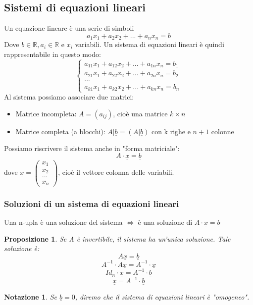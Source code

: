 \documentclass[12pt]{article}
\newenvironment{para}{\begin{adjustwidth}{13mm}{}}{\end{adjustwidth}}
\newtheorem{Proposizione}{Proposizione}[subsection]
\newtheorem{Notazione}{Notazione}[subsection]
\begin{document}
\begin{para}
\subsection{Sistemi di equazioni lineari}
Un equazione lineare è una serie di simboli $$a_1x_1 + a_2x_2+...+a_nx_n = b$$ Dove $b \in \mathbb{R}, a_i\in \mathbb{R}$ e $x_i$ variabili. Un sistema di equazioni lineari è quindi rappresentabile in questo modo: 
$$\begin{cases}
a_{11}x_1 + a_{12}x_2 + ... + a_{1n}x_n = b_1 \\
a_{21}x_1 + a_{22}x_2 + ... + a_{2n}x_n = b_2 \\
... \\
a_{k1}x_1 + a_{k2}x_2 + ... + a_{kn}x_n = b_n
\end{cases}$$ Al sistema possiamo associare due matrici:
\begin{itemize}
    \item Matrice incompleta: $A = (a_{ij})$, cioè una matrice $k \times n$
    \item Matrice completa (a blocchi): $A | \underline{b} = (A|\underline{b})$ con k righe e $n+1$ colonne
\end{itemize}
Possiamo riscrivere il sistema anche in "forma matriciale": $$A \cdot \underline{x} = \underline{b}$$ dove $\underline{x} = \begin{pmatrix}
    x_1 \\
    x_2 \\
    ... \\
    x_n
\end{pmatrix}$, cioè il vettore colonna delle variabili.
\newpage
\subsubsection{Soluzioni di un sistema di equazioni lineari}
Una n-upla è una soluzione del sistema $\Leftrightarrow$ è una soluzione di $A \cdot \underline{x} = \underline{b}$
\begin{Proposizione}
Se A è invertibile, il sistema ha un'unica soluzione. Tale soluzione è: $$A\underline{x} = \underline{b}$$
$$A^{-1} \cdot A\underline{x} = A^{-1} \cdot \underline{x}$$ $$Id_n \cdot \underline{x} = A^{-1} \cdot \underline{b}$$ $$\underline{x} = A^{-1} \cdot \underline{b}$$
\end{Proposizione}
\begin{Notazione}
Se $\underline{b} = 0$, diremo che il sistema di equazioni lineari è "omogeneo".
\end{Notazione}


\end{para}
\end{document}
